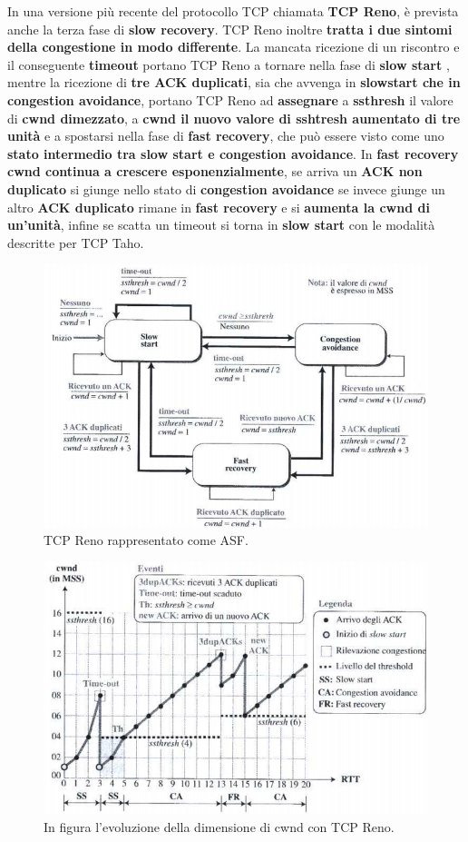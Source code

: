 \documentclass[11pt,a4paper]{article}
\theoremstyle{definition}
\begin{document}
\newpage
In una versione più recente del protocollo TCP chiamata \textbf{TCP Reno}, è prevista anche la terza fase di \textbf{slow recovery}. TCP Reno inoltre \textbf{tratta i due sintomi della congestione in modo differente}. La mancata ricezione di un riscontro e il conseguente \textbf{timeout} portano TCP Reno a tornare nella fase di \textbf{slow start }, mentre la ricezione di \textbf{tre ACK duplicati}, sia che avvenga in \textbf{slowstart che in congestion avoidance}, portano TCP Reno ad \textbf{assegnare} a \textbf{ssthresh} il valore di \textbf{cwnd dimezzato}, a \textbf{cwnd il nuovo valore di sshtresh aumentato di tre unità} e a spostarsi nella fase di \textbf{fast recovery}, che può essere visto come uno \textbf{stato intermedio tra slow start e congestion avoidance}. In \textbf{fast recovery cwnd continua a crescere esponenzialmente}, se arriva un \textbf{ACK non duplicato} si giunge nello stato di \textbf{congestion avoidance} se invece giunge un altro \textbf{ACK duplicato} rimane in \textbf{fast recovery} e si \textbf{aumenta la cwnd di un'unità}, infine se scatta un timeout si torna in \textbf{slow start} con le modalità descritte per TCP Taho.
\begin{figure}[!h]
	\includegraphics[scale=0.33]{Immagini/Reno.png}
	\centering
	\caption{TCP Reno rappresentato come ASF.}
\end{figure}
\begin{figure}[!h]
	\includegraphics[scale=0.31]{Immagini/Reno2.png}
	\centering
	\caption{In figura l'evoluzione della dimensione di cwnd con TCP Reno.}
\end{figure}
\end{document}
